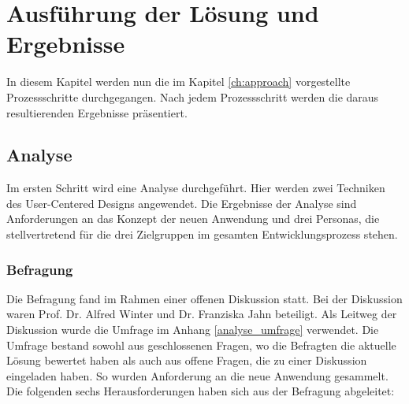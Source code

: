 \chapter{Ausführung der Lösung und Ergebnisse}\label{ch:solution}
In diesem Kapitel werden nun die im Kapitel \ref{ch:approach} vorgestellte Prozessschritte durchgegangen.
Nach jedem Prozessschritt werden die daraus resultierenden Ergebnisse präsentiert.

\section{Analyse}

Im ersten Schritt wird eine Analyse durchgeführt.
Hier werden zwei Techniken des User-Centered Designs angewendet.
Die Ergebnisse der Analyse sind Anforderungen an das Konzept der neuen Anwendung und drei Personas, die stellvertretend für die drei Zielgruppen im gesamten Entwicklungsprozess stehen.

\subsection{Befragung}

Die Befragung fand im Rahmen einer offenen Diskussion statt.
Bei der Diskussion waren Prof. Dr. Alfred Winter und Dr. Franziska Jahn beteiligt.
Als Leitweg der Diskussion wurde die Umfrage im Anhang \ref{analyse_umfrage} verwendet.
Die Umfrage bestand sowohl aus geschlossenen Fragen, wo die Befragten die aktuelle Lösung bewertet haben als auch aus offene Fragen, die zu einer Diskussion eingeladen haben.
So wurden Anforderung an die neue Anwendung gesammelt. \\

Die folgenden sechs Herausforderungen haben sich aus der Befragung abgeleitet:

